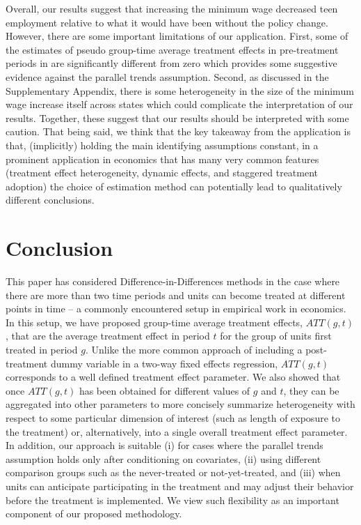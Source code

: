 \documentclass[11pt]{article}%
\theoremstyle{plain}
\numberwithin{sassumption}{section}
\numberwithin{equation}{section}
\begin{document}
Overall, our results suggest that increasing the minimum wage decreased teen
employment relative to what it would have been without the policy change.
However, there are some important limitations of our application. First, some
of the estimates of pseudo group-time average treatment effects in
pre-treatment periods in  are significantly different from
zero which provides some suggestive evidence against the parallel trends
assumption.
Second, as discussed in the Supplementary Appendix, there is some heterogeneity in the size of the
minimum wage increase itself across states which could complicate the
interpretation of our results. Together, these suggest that our results should
be interpreted with some caution. That being said, we think that the key
takeaway from the application is that, (implicitly) holding the main
identifying assumptions constant, in a prominent application in economics that
has many very common features (treatment effect heterogeneity, dynamic
effects, and staggered treatment adoption) the choice of estimation method can
potentially lead to qualitatively different conclusions.

\section{Conclusion}

This paper has considered Difference-in-Differences methods in the case where
there are more than two time periods and units can become treated at different
points in time -- a commonly encountered setup in empirical work in economics. 
In this setup, we have proposed group-time average treatment effects, $ATT(g,t)$, that are the average treatment effect in period $t$ for the group of units first treated in period $g$. Unlike the more common approach of including a post-treatment dummy variable in a two-way fixed effects regression, $ATT(g,t)$ corresponds to a well defined treatment effect parameter. We also showed that once $ATT(g,t)$ has been obtained for different values of $g$ and $t$, they can be aggregated into other parameters to more concisely summarize heterogeneity with respect to some particular dimension of interest (such as length of exposure to the treatment) or, alternatively, into a single overall treatment effect parameter. In addition, our approach is suitable (i) for cases where the parallel trends assumption holds only after conditioning on covariates, (ii) using different comparison groups such as the never-treated or not-yet-treated, and (iii) when units can anticipate participating in the treatment and may adjust their behavior before the treatment is implemented.  We view such flexibility as an important component of our proposed methodology.
\end{document}
